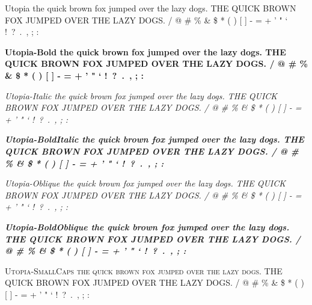 \documentclass{article}
\begin{document}
\newpage
{\selectfont
Utopia \newline
the quick brown fox jumped over the lazy dogs. \newline
THE QUICK BROWN FOX JUMPED OVER THE LAZY DOGS.  / @ \# \% \& \$ * ( ) [ ] - = + ' " ` !\ ?\ .\ , ; :  \par
{\bfseries
Utopia-Bold \newline
the quick brown fox jumped over the lazy dogs. \newline
THE QUICK BROWN FOX JUMPED OVER THE LAZY DOGS.  / @ \# \% \& \$ * ( ) [ ] - = + ' " ` !\ ?\ .\ , ; : } \par
{\itshape
Utopia-Italic \newline
the quick brown fox jumped over the lazy dogs. \newline
THE QUICK BROWN FOX JUMPED OVER THE LAZY DOGS.  / @ \# \% \& \$ * ( ) [ ] - = + ' " ` !\ ?\ .\ , ; : } \par
{\bfseries \itshape
Utopia-BoldItalic \newline
the quick brown fox jumped over the lazy dogs. \newline
THE QUICK BROWN FOX JUMPED OVER THE LAZY DOGS.  / @ \# \% \& \$ * ( ) [ ] - = + ' " ` !\ ?\ .\ , ; : } \par
{\slshape
Utopia-Oblique \newline
the quick brown fox jumped over the lazy dogs. \newline
THE QUICK BROWN FOX JUMPED OVER THE LAZY DOGS.  / @ \# \% \& \$ * ( ) [ ] - = + ' " ` !\ ?\ .\ , ; : } \par
{\bfseries \slshape
Utopia-BoldOblique \newline
the quick brown fox jumped over the lazy dogs. \newline
THE QUICK BROWN FOX JUMPED OVER THE LAZY DOGS.  / @ \# \% \& \$ * ( ) [ ] - = + ' " ` !\ ?\ .\ , ; : } \par
{\scshape
Utopia-SmallCaps \newline
the quick brown fox jumped over the lazy dogs. \newline
THE QUICK BROWN FOX JUMPED OVER THE LAZY DOGS.  / @ \# \% \& \$ * ( ) [ ] - = + ' " ` !\ ?\ .\ , ; : }} \par
\end{document}
